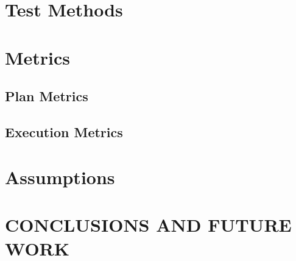 




\section{Test Methods}
\label{sect:TestMethods}




\section{Metrics}
\subsection{Plan Metrics}
\label{sect:PlanMetrics}

\subsection{Execution Metrics}
\label{sect:ExecutionMetrics}





\section{Assumptions}
\label{sect:Assumptions}


\addtolength{\textheight}{-15cm}   %


\section{CONCLUSIONS AND FUTURE WORK}
\label{sect:Conclusions}





